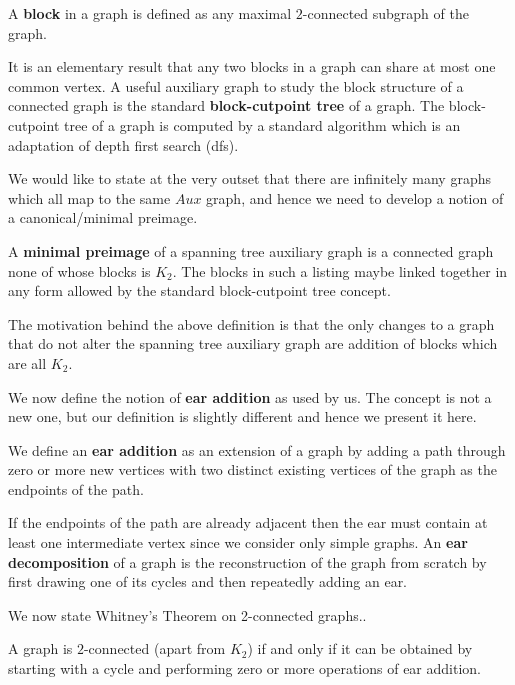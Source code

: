 \documentclass{llncs}
\begin{document}
\begin{definition}
	A {\bf block} in a graph is defined as any maximal $2$-connected subgraph of the graph.  
\end{definition}

It is an elementary result that any two blocks in a graph can share at most one common vertex. A useful auxiliary graph to study the block structure of a connected graph is the standard {\bf block-cutpoint tree} \cite{harary1966block} of a graph. The block-cutpoint tree  of a graph is computed by a standard algorithm which is an adaptation of depth first search ({\sc dfs}).

We would like to state at the very outset that there are infinitely many  graphs which all map to the same $Aux$ graph, and hence we need to develop a notion of a canonical/minimal preimage.  
\begin{definition}
	A {\bf minimal preimage} of a spanning tree auxiliary graph is a connected graph none of whose blocks is $K_2$. The blocks in such a listing maybe linked together in any form allowed by the standard block-cutpoint tree concept.
\end{definition}
The motivation behind the above definition is that the only changes to a graph that do not alter the spanning tree auxiliary graph are addition of blocks which are all $K_2$.

We now define the notion of {\bf ear addition} as used by us. The concept is not a new one, but our definition is slightly different and hence we present it here.
\begin{definition}
	We define an {\bf ear addition} as an extension of a graph by adding a path through zero or more new vertices with two distinct existing vertices of the graph as the endpoints of the path.
\end{definition}
If the endpoints of the path are already adjacent then the ear must contain at least one intermediate vertex since we consider only simple graphs. An {\bf ear decomposition} of a graph is the reconstruction of the graph from scratch by first drawing one of its cycles and then repeatedly  adding an ear.

We now state Whitney's Theorem \cite{whitney2009non} on 2-connected graphs..
\begin{theorem}
	A graph is $2$-connected (apart from $K_2$) if and only if  it can be obtained by starting with a cycle and performing zero or more operations of ear addition.
\end{theorem}
\end{document}
